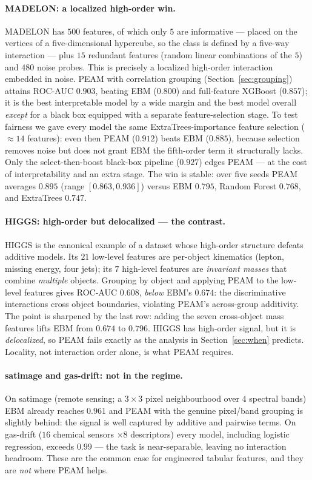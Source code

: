 \documentclass{article}
\begin{document}
\paragraph{MADELON: a localized high-order win.} MADELON
\citep{guyon2003madelon} has $500$ features, of which only $5$ are informative ---
placed on the vertices of a five-dimensional hypercube, so the class is defined
by a five-way interaction --- plus $15$ redundant features (random linear
combinations of the $5$) and $480$ noise probes. This is precisely a localized
high-order interaction embedded in noise. PEAM with correlation grouping
(Section~\ref{sec:grouping}) attains ROC-AUC $0.903$, beating EBM ($0.800$) and
full-feature XGBoost ($0.857$); it is the best interpretable model by a wide
margin and the best model overall \emph{except} for a black box equipped with a
separate feature-selection stage. To test fairness we gave every model the same
ExtraTrees-importance feature selection ($\approx 14$ features): even then PEAM
($0.912$) beats EBM ($0.885$), because selection removes noise but does not grant
EBM the fifth-order term it structurally lacks. Only the select-then-boost
black-box pipeline ($0.927$) edges PEAM --- at the cost of interpretability and an
extra stage. The win is stable: over five seeds PEAM averages $0.895$
(range $[0.863, 0.936]$) versus EBM $0.795$, Random Forest $0.768$, and
ExtraTrees $0.747$.

\paragraph{HIGGS: high-order but delocalized --- the contrast.} HIGGS
\citep{baldi2014higgs} is the canonical example of a dataset whose high-order
structure defeats additive models. Its $21$ low-level features are per-object
kinematics (lepton, missing energy, four jets); its $7$ high-level features are
\emph{invariant masses} that combine \emph{multiple} objects. Grouping by object
and applying PEAM to the low-level features gives ROC-AUC $0.608$, \emph{below}
EBM's $0.674$: the discriminative interactions cross object boundaries, violating
PEAM's across-group additivity. The point is sharpened by the last row: adding
the seven cross-object mass features lifts EBM from $0.674$ to $0.796$. HIGGS has
high-order signal, but it is \emph{delocalized}, so PEAM fails exactly as the
analysis in Section~\ref{sec:when} predicts. Locality, not interaction order
alone, is what PEAM requires.

\paragraph{satimage and gas-drift: not in the regime.} On satimage (remote
sensing; a $3{\times}3$ pixel neighbourhood over $4$ spectral bands) EBM already
reaches $0.961$ and PEAM with the genuine pixel/band grouping is slightly behind:
the signal is well captured by additive and pairwise terms. On gas-drift
($16$ chemical sensors $\times 8$ descriptors) every model, including logistic
regression, exceeds $0.99$ --- the task is near-separable, leaving no interaction
headroom. These are the common case for engineered tabular features, and they are
\emph{not} where PEAM helps.
\end{document}
